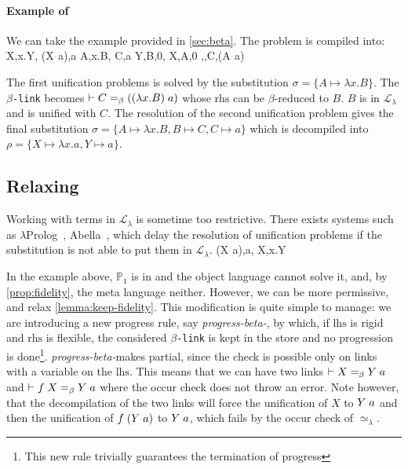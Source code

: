 \documentclass[sigconf,natbib=false,review]{acmart}
\newcommand{\appsep}{\ensuremath{\textcolor{lightgray}{\cdot}}}
\newcommand{\UnifRel}{\ensuremath{\simeq}}
\newcommand{\Ue}{\ensuremath{\UnifRel_\lambda}\xspace}
\newcommand{\llambda}{\ensuremath{\mathcal{L}_\lambda}\xspace}
\newcommand{\linkMacro}[1]{\ensuremath{#1}\texttt{-link}\xspace}
\newcommand{\linkbeta}{\linkMacro{\beta}}
\newcommand{\linkbetaM}[3]{\ensuremath{#1 \vdash #2 =_\beta #3}}
\newcommand{\lhs}{\ensuremath{\mathrm{lhs}}\xspace}
\newcommand{\rhs}{\ensuremath{\mathrm{rhs}}\xspace}
\newcommand{\foUnifPb}{\ensuremath{\mathbb{P}}\xspace}
\begin{document}
\paragraph{Example of \progBetaRH}
We can take the example provided in \cref{sec:beta}. The problem is compiled
into:
%
\printAlll
  {{{X,\lambda x.Y},
    {(X\appsep a),a}}}
  {{{A,\lambda x.B},
    {C,a}}}
  {{{Y,B,0},
    {X,A,0}}}
  {{{\beta,,C,(A\appsep a)}}}

The first unification problems is solved by the substitution $\sigma = \{A
\mapsto \lambda x.B\}$. The \linkbeta becomes
\linkbetaM{}{C}{((\lambda x.B) \appsep a)} whose \rhs can be $\beta$-reduced to
$B$. $B$ is in \llambda and is unified with $C$. The resolution of the second
unification problem
gives the final substitution $\sigma = \{A \mapsto \lambda x.B, B \mapsto C, C
\mapsto a\}$ which is decompiled into $\rho = \{X \mapsto \lambda x.a, Y \mapsto
a\}$.
 
\subsection{Relaxing }

\newcommand{\progBetaNoLLWait}{\emph{progress-beta-\notllambda}}

Working with terms in \llambda is sometime too restrictive. There exists systems
such as $\lambda$Prolog~\cite{lamProlog}, Abella~\cite{gacek2008abella}, which 
delay the resolution of \notllambda unification problems if the substitution
is not able to put them in \llambda.
%
\printAlll
  {{{(X\appsep a),a},
    {X,\lambda x.Y}}}
  {{}}
  {{}}
  {{}}

In the example above, $\foUnifPb_1$ is in \notllambda and the object language
cannot solve it, and, by \cref{prop:fidelity}, the meta language neither.
However, we can be more permissive, and relax \cref{lemma:keep-fidelity}. This
modification is quite simple to manage: we are introducing a new \notllambda
progress rule, say \progBetaNoLLWait, by which, if \lhs is rigid and \rhs is
flexible, the considered \linkbeta is kept in the store and no progression is
done\footnote{This new rule trivially guarantees the termination of progress}.
\progBetaNoLLWait makes  partial, since the check is
possible only on links with a variable on the \lhs. This means that we can have
two links \linkbetaM{}{X}{Y\appsep a} and \linkbetaM{}{f\appsep X}{Y\appsep a}
where the occur check does not throw an error. Note however, that the
decompilation of the two links will force the unification of $X$ to $Y\appsep a$
and then the unification of $f\appsep (Y \appsep a)$ to $Y\appsep a$, which
fails by the occur check of \Ue.
\end{document}
